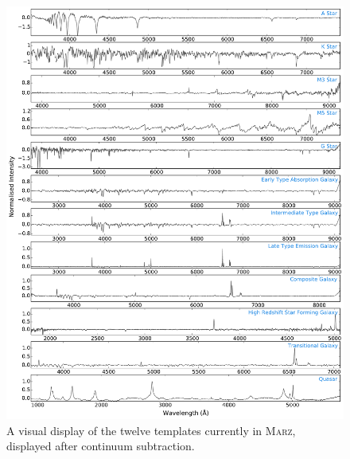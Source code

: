 \documentclass[iop]{emulateapj}
\newcommand{\marz}{\textsc{Marz}}
\begin{document}
\begin{figure}[h!]
\centering
\includegraphics[width=\textwidth]{templates.pdf}
\caption{A visual display of the twelve templates currently in \marz{}, displayed after continuum subtraction.}
\label{fig:templates}
\end{figure}
\end{document}
